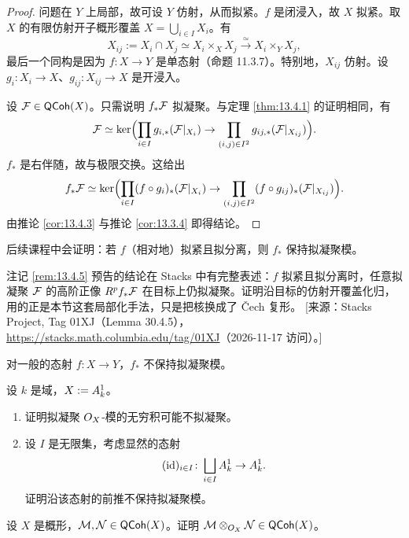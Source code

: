 \begin{proof}
问题在 $Y$ 上局部，故可设 $Y$ 仿射，从而拟紧。$f$ 是闭浸入，故 $X$ 拟紧。取 $X$ 的有限仿射开子概形覆盖 $X=\bigcup_{i\in I}X_i$。有
\[
X_{ij}:=X_i\cap X_j\simeq X_i\times_XX_j\xrightarrow{\simeq}X_i\times_YX_j,
\]
最后一个同构是因为 $f\colon X\to Y$ 是单态射（命题 11.3.7）。特别地，$X_{ij}$ 仿射。设 $g_i\colon X_i\to X$、$g_{ij}\colon X_{ij}\to X$ 是开浸入。

设 $\mathcal{F}\in\mathsf{QCoh}(X)$。只需说明 $f_*\mathcal{F}$ 拟凝聚。与定理 \ref{thm:13.4.1} 的证明相同，有
\[
\mathcal{F}\simeq\ker\Bigl(\prod_{i\in I}g_{i,*}(\mathcal{F}|_{X_i})\to\prod_{(i,j)\in I^2}g_{ij,*}(\mathcal{F}|_{X_{ij}})\Bigr).
\]
$f_*$ 是右伴随，故与极限交换。这给出
\[
f_*\mathcal{F}\simeq\ker\Bigl(\prod_{i\in I}(f\circ g_i)_*(\mathcal{F}|_{X_i})\to\prod_{(i,j)\in I^2}(f\circ g_{ij})_*(\mathcal{F}|_{X_{ij}})\Bigr).
\]
由推论 \ref{cor:13.4.3} 与推论 \ref{cor:13.3.4} 即得结论。
\end{proof}

\begin{remark}\label{rem:13.4.5}
后续课程中会证明：若 $f$（相对地）拟紧且拟分离，则 $f_*$ 保持拟凝聚模。
\end{remark}

\begin{yizhu}
注记 \ref{rem:13.4.5} 预告的结论在 Stacks 中有完整表述：$f$ 拟紧且拟分离时，任意拟凝聚 $\mathcal{F}$ 的高阶正像 $R^pf_*\mathcal{F}$ 在目标上仍拟凝聚。证明沿目标的仿射开覆盖化归，用的正是本节这套局部化手法，只是把核换成了 Čech 复形。
[来源：Stacks Project, Tag 01XJ（Lemma 30.4.5），\url{https://stacks.math.columbia.edu/tag/01XJ}（2026-11-17 访问）。]
\end{yizhu}

\begin{warning}\label{warn:13.4.6}
对一般的态射 $f\colon X\to Y$，$f_*$ 不保持拟凝聚模。
\end{warning}

\begin{exercise}\label{exc:13.4.7}
设 $k$ 是域，$X:=A^1_k$。
\begin{enumerate}[label=(\arabic*),leftmargin=2em,itemsep=0.25ex]
  \item 证明拟凝聚 $O_X$-模的无穷积可能不拟凝聚。
  \item 设 $I$ 是无限集，考虑显然的态射
  \[
  (\operatorname{id})_{i\in I}\colon\bigsqcup_{i\in I}A^1_k\to A^1_k.
  \]
  证明沿该态射的前推不保持拟凝聚模。
\end{enumerate}
\end{exercise}

\begin{exercise}\label{exc:13.4.8}
设 $X$ 是概形，$\mathcal{M},\mathcal{N}\in\mathsf{QCoh}(X)$。证明 $\mathcal{M}\otimes_{O_X}\mathcal{N}\in\mathsf{QCoh}(X)$。
\end{exercise}
